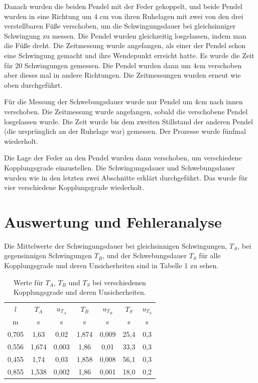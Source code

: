 \documentclass[11pt,a4paper]{article}
\begin{document}
Danach wurden die beiden Pendel mit der Feder gekoppelt, und beide Pendel wurden in eine Richtung um 4 cm von ihren Ruhelagen mit zwei von den drei verstellbaren Füße verschoben, um die Schwingungsdauer bei gleichsinniger Schwingung zu messen. Die Pendel wurden gleichzeitig losgelassen, indem man die Füße dreht. Die Zeitmessung wurde angefangen, als einer der Pendel schon eine Schwingung gemacht und ihre Wendepunkt erreicht hatte. Es wurde die Zeit für 20 Schwingungen gemessen. Die Pendel wurden dann um 4cm verschoben aber dieses mal in andere Richtungen. Die Zeitmessungen wurden erneut wie oben durchgeführt. 

Für die Messung der Schwebungsdauer wurde nur Pendel um 4cm nach innen verschoben. Die Zeitmessung wurde angefangen, sobald die verschobene Pendel losgelassen wurde. Die Zeit wurde bis dem zweiten Stillstand der anderen Pendel (die ursprünglich an der Ruhelage war) gemessen. Der Prozesse wurde fünfmal wiederholt. 

Die Lage der Feder an den Pendel wurden dann verschoben, um verschiedene Kopplungsgrade einzustellen. Die Schwingungsdauer und Schwebungsdauer wurden wie in den letzten zwei Abschnitte erklärt durchgeführt. Das wurde für vier verschiedene Kopplungsgrade wiederholt. 

\section{Auswertung und Fehleranalyse}
Die Mittelwerte der Schwingungsdauer bei gleichsinnigen Schwingungen, $T_A$, bei gegensinnigen Schwingungen $T_B$, und der Schwebungsdauer $T_S$ für alle Kopplungsgrade und deren Unsicherheiten sind in Tabelle 1 zu sehen. 
\begin{table} [h]
	\begin{tabular*}{0.99\textwidth}{@{\extracolsep{\fill}}c|cccccc}
		\toprule
		$l$ & $T_A$ & $u_{T_A}$ & $T_B$ & $u_{T_B}$ & $T_S$ & $u_{T_S}$  \\
		m & s & s & s & s & s & s   \\
		\bottomrule
		0,705 & 1,63 & 0,02 & 1,874 & 0,009 & 25,4 & 0,3 \\
		0,556 & 1,674 & 0,003 & 1,86 & 0,01 & 33,3 & 0,3 \\
		0,455 & 1,74 & 0,03 & 1,858 & 0,008 & 56,1 & 0,3\\
		0,855 & 1,538 & 0,002 & 1,86 & 0,001 & 18,0 & 0,2 \\
		\bottomrule
	\end{tabular*}
	\caption{Werte für $T_A$, $T_B$ und $T_S$ bei verschiedenen Kopplungsgrade und deren Unsicherheiten.}
\end{table}
\end{document}
